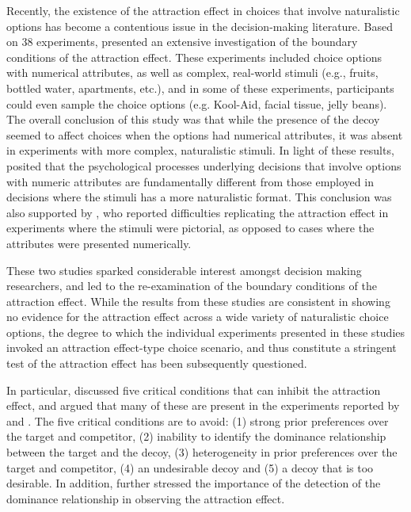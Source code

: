 \documentclass[12pt, a4paper]{article}
\begin{document}
Recently, the existence of the attraction effect in choices that involve naturalistic options has become a contentious issue in the decision-making literature. Based on 38 experiments,  presented an extensive investigation of the boundary conditions of the attraction effect. These experiments included choice options with numerical attributes, as well as complex, real-world stimuli (e.g., fruits, bottled water, apartments, etc.), and in some of these experiments, participants could even sample the choice options (e.g. Kool-Aid, facial tissue, jelly beans). The overall conclusion of this study was that while the presence of the decoy seemed to affect choices when the options had numerical attributes, it was absent in experiments with more complex, naturalistic stimuli. In light of these results, \citeauthor{Frederick2014} posited that the psychological processes underlying decisions that involve options with numeric attributes are fundamentally different from those employed in decisions where the stimuli has a more naturalistic format. This conclusion was also supported by , who reported difficulties replicating the attraction effect in experiments where the stimuli were pictorial, as opposed to cases where the attributes were presented numerically.

These two studies sparked considerable interest amongst decision making researchers, and led to the re-examination of the boundary conditions of the attraction effect. While the results from these studies are consistent in showing no evidence for the attraction effect across a wide variety of naturalistic choice options, the degree to which the individual experiments presented in these studies invoked an attraction effect-type choice scenario, and thus constitute a stringent test of the attraction effect has been subsequently questioned.
  
In particular,  discussed five critical conditions that can inhibit the attraction effect, and argued that many of these are present in the experiments reported by  and . The five critical conditions are to avoid: (1) strong prior preferences over the target and competitor, (2) inability to identify the dominance relationship  between the target and the decoy, (3) heterogeneity in prior preferences over the target and competitor, (4) an undesirable decoy and (5) a decoy that is too desirable. In addition,  further stressed the importance of the detection of the dominance relationship in observing the attraction effect. 
\end{document}
